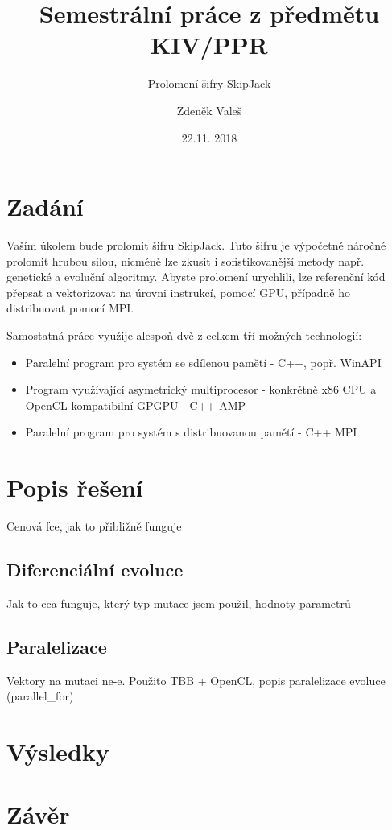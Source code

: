 \documentclass[11pt,a4paper]{scrartcl}
\begin{document}
	\title{Semestrální práce z předmětu KIV/PPR}
	\subtitle{Prolomení šifry SkipJack}
	\author{Zdeněk Valeš}
	\date{22.11. 2018}
	\maketitle
	\newpage
	
	\section{Zadání}
	Vaším úkolem bude prolomit šifru SkipJack. Tuto šifru je výpočetně náročné prolomit hrubou silou, nicméně lze zkusit i sofistikovanější metody např. genetické a evoluční algoritmy. Abyste prolomení urychlili, lze referenční kód přepsat a vektorizovat na úrovni instrukcí, pomocí GPU, případně ho distribuovat pomocí MPI.
	
	Samostatná práce využije alespoň dvě z celkem tří možných technologií:
	
	\begin{itemize}
		\item Paralelní program pro systém se sdílenou pamětí - C++, popř. WinAPI
		\item Program využívající asymetrický multiprocesor - konkrétně x86 CPU a OpenCL kompatibilní GPGPU - C++ AMP
		\item Paralelní program pro systém s distribuovanou pamětí - C++ MPI
	\end{itemize}
	
	\section{Popis řešení}
	Cenová fce, jak to přibližně funguje
	
	\subsection{Diferenciální evoluce}
	Jak to cca funguje, který typ mutace jsem použil, hodnoty parametrů
	
	\subsection{Paralelizace}
	Vektory na mutaci ne-e. Použito TBB + OpenCL, popis paralelizace evoluce (parallel\_for)
	
	\section{Výsledky}
	
	\section{Závěr}
	
\end{document}

